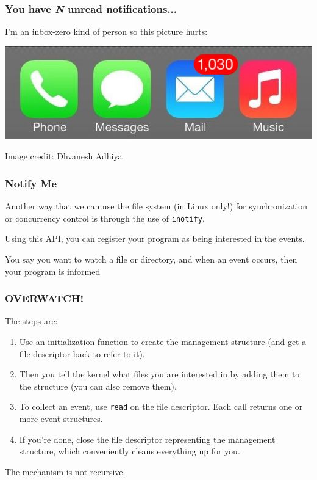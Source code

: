 \begin{frame}
\frametitle{You have \textit{N} unread notifications...}

I'm an inbox-zero kind of person so this picture hurts:

\begin{center}
	\includegraphics[width=\textwidth]{images/inbox-nonzero.jpg}
\end{center}
\hfill Image credit: Dhvanesh Adhiya

\end{frame}


\begin{frame}
\frametitle{Notify Me}

Another way that we can use the file system (in Linux only!) for synchronization or concurrency control is through the use of \texttt{inotify}.

Using this API, you can register your program as being interested in the events.

You say you want to watch a file or directory, and when an event occurs, then your program is informed

\end{frame}


\begin{frame}
\frametitle{OVERWATCH!}

The steps are:

\begin{enumerate}
	\item Use an initialization function to create the management structure (and get a file descriptor back to refer to it).
	\item Then you tell the kernel what files you are interested in by adding them to the structure (you can also remove them).
	\item To collect an event, use \texttt{read} on the file descriptor. Each call returns one or more event structures.
	\item If you're done, close the file descriptor representing the management structure, which conveniently cleans everything up for you.
\end{enumerate}

The mechanism is not recursive.

\end{frame}

